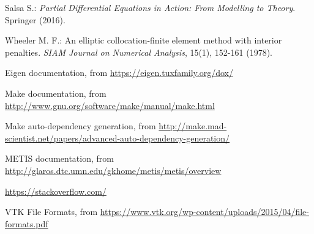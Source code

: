 \documentclass[12pt, a4paper]{article}
\theoremstyle{definition}
\theoremstyle{plain}
\theoremstyle{plain}
\theoremstyle{definition}
\begin{document}
\begin{thebibliography}{99}
	Salsa S.: \emph{Partial Differential Equations in Action: From Modelling to 
	Theory}. Springer (2016).

	Wheeler M. F.: An elliptic collocation-finite element method with interior 
	penalties. \emph{SIAM Journal on Numerical Analysis}, 15(1), 152-161 (1978).
	
	Eigen documentation, from {\footnotesize \url{https://eigen.tuxfamily.org/dox/}}
	
	Make documentation, from {\footnotesize \url{http://www.gnu.org/software/make/manual/make.html}}
	
	Make auto-dependency generation, from {\footnotesize \url{http://make.mad-scientist.net/papers/advanced-auto-dependency-generation/}}
	
	METIS documentation, from {\footnotesize \url{http://glaros.dtc.umn.edu/gkhome/metis/metis/overview}}
	
	{\footnotesize \url{https://stackoverflow.com/}}
	
	VTK File Formats, from {\footnotesize 
	\url{https://www.vtk.org/wp-content/uploads/2015/04/file-formats.pdf}}
	
\end{thebibliography}
\end{document}
